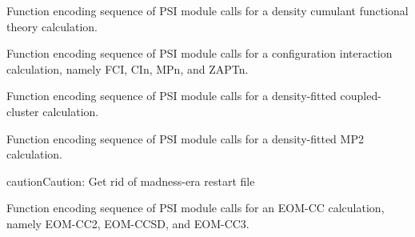 \documentclass[letterpaper,10pt,english]{sphinxmanual}
\begin{document}
\begin{fulllineitems}
\label{index:proc.run_dcft}
Function encoding sequence of PSI module calls for
a density cumulant functional theory calculation.

\end{fulllineitems}


\begin{fulllineitems}
\label{index:proc.run_detci}
Function encoding sequence of PSI module calls for
a configuration interaction calculation, namely FCI,
CIn, MPn, and ZAPTn.

\end{fulllineitems}


\begin{fulllineitems}
\label{index:proc.run_dfcc}
Function encoding sequence of PSI module calls for
a density-fitted coupled-cluster calculation.

\end{fulllineitems}


\begin{fulllineitems}
\label{index:proc.run_dfmp2}
Function encoding sequence of PSI module calls for
a density-fitted MP2 calculation.

\begin{notice}{caution}{Caution:}
Get rid of madness-era restart file
\end{notice}

\end{fulllineitems}


\begin{fulllineitems}
\label{index:proc.run_eom_cc}
Function encoding sequence of PSI module calls for
an EOM-CC calculation, namely EOM-CC2, EOM-CCSD, and EOM-CC3.

\end{fulllineitems}
\end{document}
